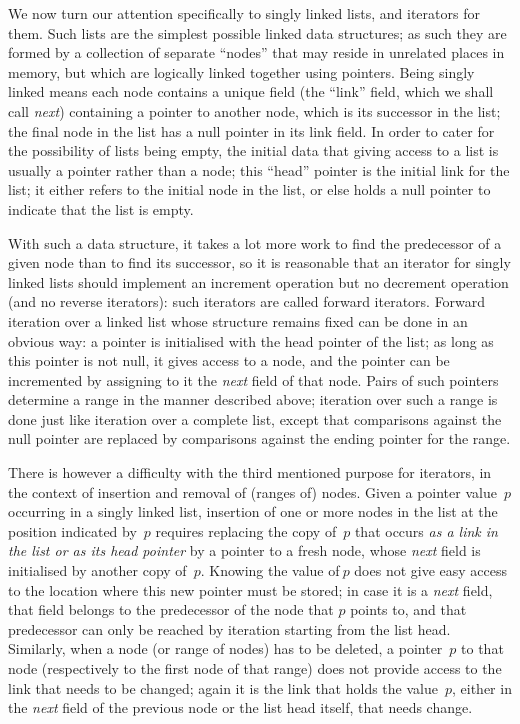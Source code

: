 \documentclass[12pt]{article}
\theoremstyle{plain}
\theoremstyle{definition}
\begin{document}
We now turn our attention specifically to singly linked lists, and iterators for
them. Such lists are the simplest possible linked data structures; as such they
are formed by a collection of separate ``nodes'' that may reside in unrelated
places in memory, but which are logically linked together using pointers. Being
singly linked means each node contains a unique field (the ``link'' field, which
we shall call \textit{next}) containing a pointer to another node, which is its
successor in the list; the final node in the list has a null pointer in its link
field. In order to cater for the possibility of lists being empty, the initial
data that giving access to a list is usually a pointer rather than a node; this
``head'' pointer is the initial link for the list; it either refers to the
initial node in the list, or else holds a null pointer to indicate that the list
is empty.

With such a data structure, it takes a lot more work to find the predecessor of
a given node than to find its successor, so it is reasonable that an iterator
for singly linked lists should implement an increment operation but no decrement
operation (and no reverse iterators): such iterators are called forward
iterators. Forward iteration over a linked list whose structure remains fixed
can be done in an obvious way: a pointer is initialised with the head pointer of
the list; as long as this pointer is not null, it gives access to a node, and
the pointer can be incremented by assigning to it the \textit{next} field of
that node. Pairs of such pointers determine a range in the manner described
above; iteration over such a range is done just like iteration over a complete
list, except that comparisons against the null pointer are replaced by
comparisons against the ending pointer for the range.

There is however a difficulty with the third mentioned purpose for iterators, in
the context of insertion and removal of (ranges of) nodes. Given a pointer
value~$p$ occurring in a singly linked list, insertion of one or more nodes in
the list at the position indicated by~$p$ requires replacing the copy of~$p$
that occurs \emph{as a link in the list or as its head pointer} by a pointer to
a fresh node, whose \textit{next} field is initialised by another copy of~$p$.
Knowing the value of$~p$ does not give easy access to the location where this
new pointer must be stored; in case it is a \textit{next} field, that field
belongs to the predecessor of the node that $p$ points to, and that predecessor
can only be reached by iteration starting from the list head. Similarly, when a
node (or range of nodes) has to be deleted, a pointer~$p$ to that node
(respectively to the first node of that range) does not provide access to the
link that needs to be changed; again it is the link that holds the value~$p$,
either in the \textit{next} field of the previous node or the list head itself,
that needs change.
\end{document}
